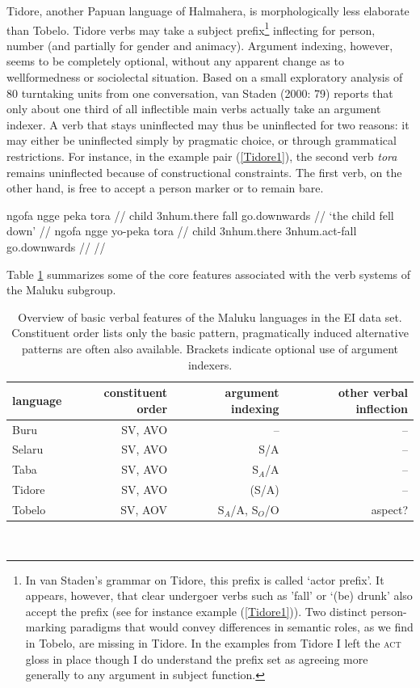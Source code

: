 Tidore, another Papuan language of Halmahera, is morphologically less elaborate than Tobelo. Tidore verbs may take a subject prefix\footnote{In van Staden's grammar on Tidore, this prefix is called `actor prefix'. It appears, however, that clear undergoer verbs such as 'fall' or `(be) drunk' also accept the prefix (see for instance example (\ref{Tidore1})). Two distinct person-marking paradigms that would convey differences in semantic roles, as we find in Tobelo, are missing in Tidore. In the examples from Tidore I left the \textsc{act} gloss in place though I do understand the prefix set as agreeing more generally to any argument in subject function.} inflecting for person, number (and partially for gender and animacy). Argument indexing, however, seems to be completely optional, without any apparent change as to wellformedness or sociolectal situation. Based on a small exploratory analysis of 80 turntaking units from one conversation, van Staden (2000: 79) reports that only about one third of all inflectible main verbs actually take an argument indexer. A verb that stays uninflected may thus be uninflected for two reasons: it may either be uninflected simply by pragmatic choice, or through grammatical restrictions. For instance, in the example pair (\ref{Tidore1}), the second verb \textit{tora} remains uninflected because of constructional constraints. The first verb, on the other hand, is free to accept a person marker or to remain bare.

\pex \label{Tidore1}
\a
\begingl
\gla ngofa ngge peka tora // 
\glb child 3\acs{nhum}.there fall go.downwards //
\glft `the child fell down’ // 
\endgl
\a
\begingl
\gla ngofa ngge yo-peka tora // 
\glb child 3\acs{nhum}.there 3\acs{nhum}.\acs{act}-fall go.downwards //
\glft  {}// 
\endgl
\xe

Table \ref{table:overviewmaluku} summarizes some of the core features associated with the verb systems of the Maluku subgroup.

\begin{table}[h]
\begin{center}
\begin{footnotesize}
\begin{tabular}{l r r r}
\hline\hline
language & constituent order & argument indexing & other verbal inflection \tabularnewline
\hline
Buru & SV, AVO & -- & -- \tabularnewline
Selaru & SV, AVO & S/A & -- \tabularnewline
Taba & SV, AVO & S$_A$/A & -- \tabularnewline
Tidore & SV, AVO & (S/A) & -- \tabularnewline
Tobelo & SV, AOV & S$_A$/A, S$_O$/O & aspect? \tabularnewline
\hline
\end{tabular}
\caption[Basic features of Maluku verb systems]{Overview of basic verbal features of the Maluku languages in the EI data set. Constituent order lists only the basic pattern, pragmatically induced alternative patterns are often also available. Brackets indicate optional use of argument indexers.}
\label{table:overviewmaluku}
\end{footnotesize}
\end{center}
\end{table}
\

